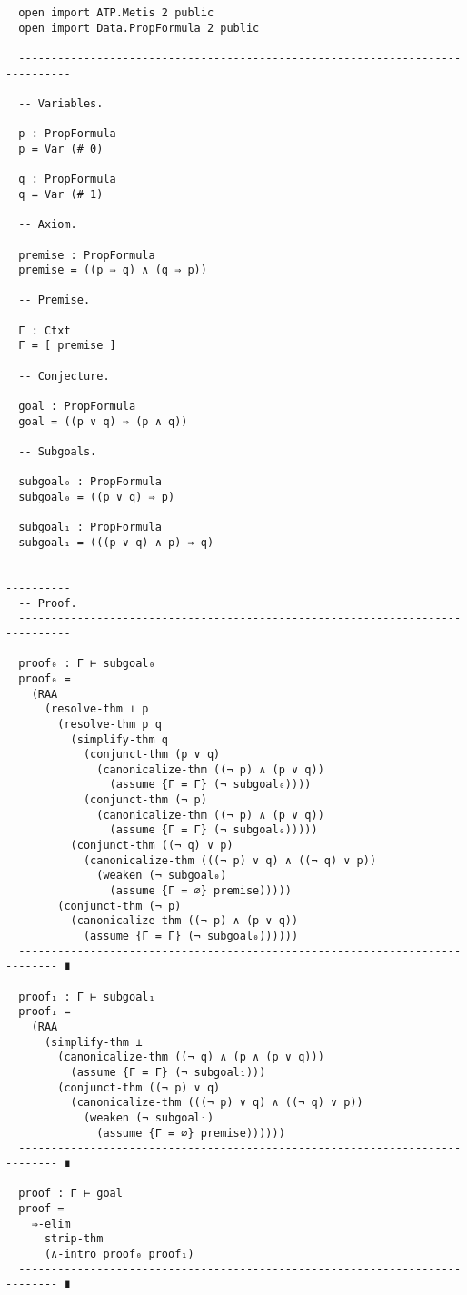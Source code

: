\documentclass[../main.tex]{subfiles}
\begin{document}
\begin{subappendices}
\begin{verbatim}
  open import ATP.Metis 2 public
  open import Data.PropFormula 2 public

  ------------------------------------------------------------------------------

  -- Variables.

  p : PropFormula
  p = Var (# 0)

  q : PropFormula
  q = Var (# 1)

  -- Axiom.

  premise : PropFormula
  premise = ((p ⇒ q) ∧ (q ⇒ p))

  -- Premise.

  Γ : Ctxt
  Γ = [ premise ]

  -- Conjecture.

  goal : PropFormula
  goal = ((p ∨ q) ⇒ (p ∧ q))

  -- Subgoals.

  subgoal₀ : PropFormula
  subgoal₀ = ((p ∨ q) ⇒ p)

  subgoal₁ : PropFormula
  subgoal₁ = (((p ∨ q) ∧ p) ⇒ q)

  ------------------------------------------------------------------------------
  -- Proof.
  ------------------------------------------------------------------------------

  proof₀ : Γ ⊢ subgoal₀
  proof₀ =
    (RAA
      (resolve-thm ⊥ p
        (resolve-thm p q
          (simplify-thm q
            (conjunct-thm (p ∨ q)
              (canonicalize-thm ((¬ p) ∧ (p ∨ q))
                (assume {Γ = Γ} (¬ subgoal₀))))
            (conjunct-thm (¬ p)
              (canonicalize-thm ((¬ p) ∧ (p ∨ q))
                (assume {Γ = Γ} (¬ subgoal₀)))))
          (conjunct-thm ((¬ q) ∨ p)
            (canonicalize-thm (((¬ p) ∨ q) ∧ ((¬ q) ∨ p))
              (weaken (¬ subgoal₀)
                (assume {Γ = ∅} premise)))))
        (conjunct-thm (¬ p)
          (canonicalize-thm ((¬ p) ∧ (p ∨ q))
            (assume {Γ = Γ} (¬ subgoal₀))))))
  ---------------------------------------------------------------------------- ∎

  proof₁ : Γ ⊢ subgoal₁
  proof₁ =
    (RAA
      (simplify-thm ⊥
        (canonicalize-thm ((¬ q) ∧ (p ∧ (p ∨ q)))
          (assume {Γ = Γ} (¬ subgoal₁)))
        (conjunct-thm ((¬ p) ∨ q)
          (canonicalize-thm (((¬ p) ∨ q) ∧ ((¬ q) ∨ p))
            (weaken (¬ subgoal₁)
              (assume {Γ = ∅} premise))))))
  ---------------------------------------------------------------------------- ∎

  proof : Γ ⊢ goal
  proof =
    ⇒-elim
      strip-thm
      (∧-intro proof₀ proof₁)
  ---------------------------------------------------------------------------- ∎
\end{verbatim}


\end{subappendices}
\end{document}
